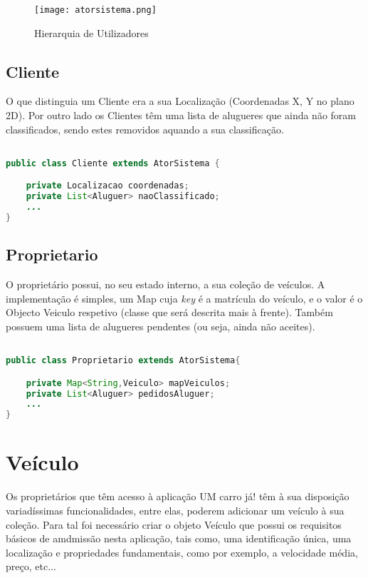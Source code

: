 \documentclass[a4paper,11pt]{report}
\begin{document}
    \begin{figure}[H]
        \centering
        \texttt{[image: atorsistema.png]}
        \label{img:logo}
        \caption{Hierarquia de Utilizadores}
    \end{figure}
    
\subsection{Cliente}
   
\hspace{0.50cm} O que distinguia um Cliente era a sua Localização (Coordenadas X, Y no plano 2D). Por outro lado os Clientes têm uma lista de alugueres que ainda não foram classificados, sendo estes removidos aquando a sua classificação.

\begin{lstlisting}[language=java]

public class Cliente extends AtorSistema {

    private Localizacao coordenadas;
    private List<Aluguer> naoClassificado;
    ...
}
\end{lstlisting}

\subsection{Proprietario}

\hspace{0.50cm} O proprietário possui, no seu estado interno, a sua coleção de veículos. A implementação é simples, um Map cuja \textit{key} é a matrícula do veículo, e o valor é o Objecto Veiculo respetivo (classe que será descrita mais à frente). Também possuem uma lista de alugueres pendentes (ou seja, ainda não aceites).

\begin{lstlisting}[language=java]

public class Proprietario extends AtorSistema{

    private Map<String,Veiculo> mapVeiculos;
    private List<Aluguer> pedidosAluguer;
    ...
}
\end{lstlisting}

\section{Veículo}

\hspace{0.50cm} Os proprietários que têm acesso à aplicação UM carro já! têm à sua disposição variadíssimas funcionalidades, entre elas, poderem adicionar um veículo à sua coleção. Para tal foi necessário criar o objeto Veículo que possui os requisitos básicos de amdmissão nesta aplicação, tais como, uma identificação única, uma localização e propriedades fundamentais, como por exemplo, a velocidade média, preço, etc...
\end{document}
